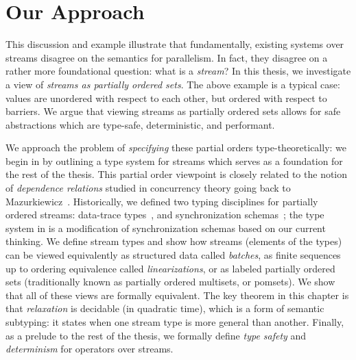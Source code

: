 \section{Our Approach}

This discussion and example illustrate that fundamentally, existing systems over streams disagree on the semantics for parallelism.
In fact, they disagree on a rather more foundational question: what is a \emph{stream}?
In this thesis, we investigate a view of \emph{streams as partially ordered sets}.
The above example is a typical case: values are unordered with respect to each other, but ordered with respect to barriers.
We argue that viewing streams as partially ordered sets allows for safe abstractions which are type-safe, deterministic, and performant.

We approach the problem of \emph{specifying} these partial orders type-theoretically: we begin in  by
outlining a type system for streams which serves as a foundation for the rest of the thesis.
This partial order viewpoint is closely related to the notion of \emph{dependence relations} studied in concurrency theory going back to Mazurkiewicz~\cite{mazurkiewicz1986trace}.
Historically, we defined two typing disciplines for partially ordered streams:
data-trace types~,
and synchronization schemas~;
the type system in  is a modification of synchronization schemas based on our current thinking.
We define stream types and show how streams (elements of the types) can be viewed equivalently as structured data called \emph{batches}, as finite sequences up to ordering equivalence called \emph{linearizations}, or as labeled partially ordered sets (traditionally known as partially ordered multisets, or pomsets).
We show that all of these views are formally equivalent.
The key theorem in this chapter is that \emph{relaxation} is decidable (in quadratic time), which is a form of semantic subtyping: it states when one stream type is more general than another.
Finally, as a prelude to the rest of the thesis, we formally define \emph{type safety} and \emph{determinism} for operators over streams.

